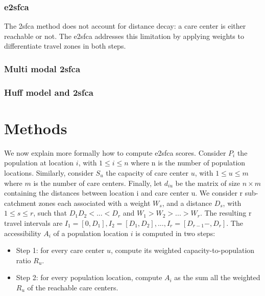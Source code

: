 \subsubsection*{\acf{e2sfca}}

The \ac{2sfca} method does not account for distance decay: a care center is either reachable or not. The \ac{e2sfca} \cite{luo_enhanced_2009} addresses this limitation by applying weights to differentiate travel zones in both steps.

\subsubsection*{Multi modal \acl{2sfca}}


\cite{langford_multi-modal_2016}

\subsubsection*{Huff model and \acl{2sfca}}


\cite{luo_integrating_2014}

\section{Methods}

We now explain more formally how to compute \ac{e2sfca} scores. Consider $P_i$ the population at location $i$, with $1 \leq i \leq n$ where n is the number of population locations. Similarly, consider $S_u$ the capacity of care center $u$, with $1 \leq u \leq m$ where $m$ is the number of care centers. Finally, let $d_{iu}$ be the matrix of size $n \times m$ containing the distances between location i and care center u. We consider r sub-catchment zones each associated with a weight $W_s$, and a distance $D_s$, with $1 \leq s \leq r$, such that $D_1 D_2 < ... < D_r$ and $W_1 > W_2 > ... > W_r$. The resulting r travel intervals are $I_1=[0, D_1], I_2=[D_1, D_2 ], ... ,I_r=[D_{r-1}-,D_r]$. The accessibility $A_i$ of a population location $i$ is computed in two steps:

\begin{itemize}
    \item Step 1: for every care center $u$, compute its weighted capacity-to-population ratio $R_u$.
    \item Step 2: for every population location, compute $A_i$ as the sum all the weighted $R_u$ of the reachable care centers.
\end{itemize}

